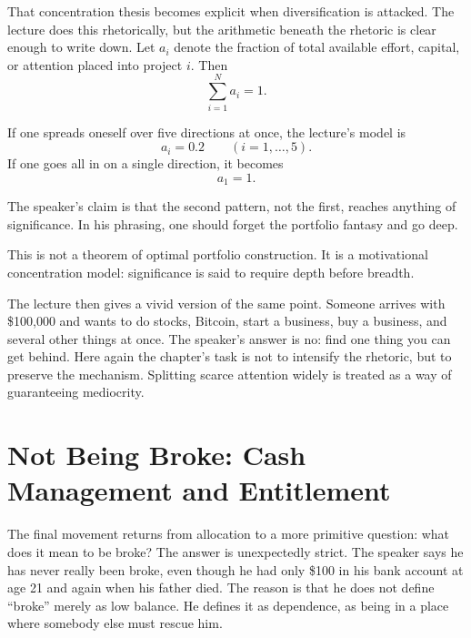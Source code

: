 That concentration thesis becomes explicit when diversification is attacked. The lecture does this rhetorically, but the arithmetic beneath the rhetoric is clear enough to write down. Let \(a_i\) denote the fraction of total available effort, capital, or attention placed into project \(i\). Then
\begin{equation}
\sum_{i=1}^{N} a_i = 1.
\end{equation}

If one spreads oneself over five directions at once, the lecture's model is
\begin{equation}
a_i = 0.2\qquad (i=1,\dots,5).
\end{equation}
If one goes all in on a single direction, it becomes
\begin{equation}
a_1 = 1.
\end{equation}

The speaker's claim is that the second pattern, not the first, reaches anything of significance. In his phrasing, one should forget the portfolio fantasy and go deep.

\begin{remark}
This is not a theorem of optimal portfolio construction. It is a motivational concentration model: significance is said to require depth before breadth.
\end{remark}

The lecture then gives a vivid version of the same point. Someone arrives with \$100{,}000 and wants to do stocks, Bitcoin, start a business, buy a business, and several other things at once. The speaker's answer is no: find one thing you can get behind. Here again the chapter's task is not to intensify the rhetoric, but to preserve the mechanism. Splitting scarce attention widely is treated as a way of guaranteeing mediocrity.

\section{Not Being Broke: Cash Management and Entitlement}

The final movement returns from allocation to a more primitive question: what does it mean to be broke? The answer is unexpectedly strict. The speaker says he has never really been broke, even though he had only \$100 in his bank account at age 21 and again when his father died. The reason is that he does not define ``broke'' merely as low balance. He defines it as dependence, as being in a place where somebody else must rescue him.

